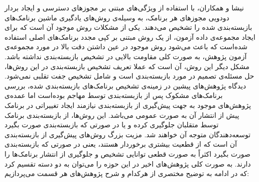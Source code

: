 نیشا و همکاران، با استفاده از ویژگی‌های مبتنی بر مجوز‌‌های دسترسی و ایجاد بردار دودویی مجوز‌های هر برنامک، به وسیله‌ی روش‌های یاد‌گیری ماشین برنامک‌های بازبسته‌بندی شده را تشخیص می‌دهند. یکی از مشکلات روش موجود آن است که برای ایجاد مجموعه‌ی داده آزمون، از یک روش مبتنی بر کپی مجدد برنامک‌های اصلی استفاده شده‌است که باعث می‌شود روش موجود در عین داشتن دقت بالا در مورد مجموعه‌ی آزمون پژوهش، به صورت کلی مقاومت بالایی در تشخیص بازبسته‌بندی نداشته باشد. مشکل دیگر این روش، آن است که عملا تعریف تشخیص بازبسته‌بندی در این روش‌ها، حل مسئله‌ی تصمیم در مورد بازبسته‌بندی است و شامل تشخیص جفت تقلبی نمی‌شود.
دیدگاه پژوهش‌های پیشین در زمینه‌ی تشخیص برنامک‌های بازبسته‌بندی شده، بررسی برنامک‌های مشکوک پس از بازبسته‌بندی توسط مهاجم بوده‌است اما
عمده‌ی پژوهش‌های موجود به جهت پیش‌گیری از بازبسته‌بندی نیازمند ایجاد تغییراتی در برنامک پیش از انتشار آن به صورت عمومی می‌باشد. این روش‌ها، از بازبسته‌بندی برنامک توسط متقلبان جلوگیری کرده و یا در صورتی که بازبسته‌بندی صورت بگیرد توسعه‌دهندگان متوجه آن خواهند‌ شد. مزیت بزرگ روش‌های پیش‌گیری از بازبسته‌بندی آن‌ است که از قطعیت بیشتری برخوردار هستند، یعنی در صورتی که بازبسته‌بندی صورت بگیرد اکثراً به صورت قطعی توانایی تشخیص و جلوگیری از انتشار برنامک‌ها را دارند. به صورت کلی پژوهش‌های اخیر در این حوزه را می‌توان به دو دسته تقسیم کرد که در ادامه به توضیح مختصری از هر‌کدام و شرح پژوهش‌های هر قسمت می‌پردازیم:



